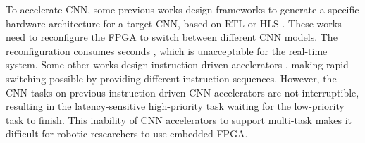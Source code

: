 





To accelerate CNN, some previous works design frameworks to generate a specific hardware architecture for a target CNN, based on RTL \cite{li_high_2016} or HLS \cite{lu_evaluating_2017}. These works need to reconfigure the FPGA to switch between different CNN models. The reconfiguration consumes seconds \cite{FPGAPerformance}, which is unacceptable for the real-time system.
Some other works design instruction-driven accelerators \cite{yu2018instruction,qiu2016going,guo2017angel,dpu}, making rapid switching possible by providing different instruction sequences. 
However, the CNN tasks on previous instruction-driven CNN accelerators are not interruptible, resulting in the latency-sensitive high-priority task waiting for the low-priority task to finish. 
This inability of CNN accelerators to support multi-task makes it difficult for robotic researchers to use embedded FPGA.